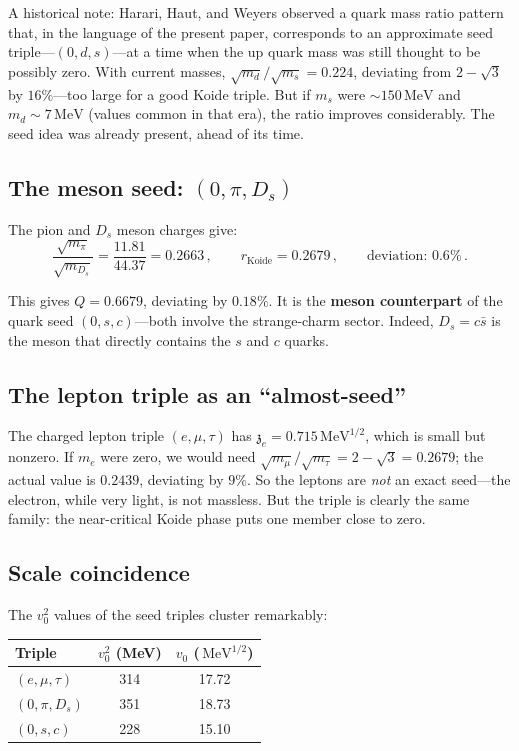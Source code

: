 \documentclass[12pt,a4paper]{article}
\newcommand{\MeV}{\,\text{MeV}}
\newcommand{\zch}{\mathfrak{z}}
\begin{document}
A historical note: Harari, Haut, and Weyers \cite{Harari} observed 
a quark mass ratio pattern that, in the language of the present paper, 
corresponds to an approximate seed triple---$(0, d, s)$---at a time 
when the up quark mass was 
still thought to be possibly zero. With current masses, 
$\sqrt{m_d}/\sqrt{m_s} = 0.224$, deviating from $2 - \sqrt{3}$ by 
$16\%$---too large for a good Koide triple. But if $m_s$ were 
$\sim 150\MeV$ and $m_d \sim 7\MeV$ (values common in that era), the 
ratio improves considerably. The seed idea was already present, ahead 
of its time.

\subsection{The meson seed: $(0, \pi, D_s)$}

The pion and $D_s$ meson charges give:
\begin{equation}
\frac{\sqrt{m_\pi}}{\sqrt{m_{D_s}}} = \frac{11.81}{44.37} = 0.2663\,, 
\qquad r_{\text{Koide}} = 0.2679\,, \qquad \text{deviation: } 0.6\%\,.
\end{equation}

This gives $Q = 0.6679$, deviating by $0.18\%$. It is the 
\textbf{meson counterpart} of the quark seed $(0, s, c)$---both 
involve the strange-charm sector. Indeed, $D_s = c\bar{s}$ is the 
meson that directly contains the $s$ and $c$ quarks.

\subsection{The lepton triple as an ``almost-seed''}

The charged lepton triple $(e, \mu, \tau)$ has $\zch_e = 0.715\MeV^{1/2}$, 
which is small but nonzero. If $m_e$ were zero, we would need 
$\sqrt{m_\mu}/\sqrt{m_\tau} = 2 - \sqrt{3} = 0.2679$; the actual value 
is $0.2439$, deviating by $9\%$. So the leptons are \emph{not} an 
exact seed---the electron, while very light, is not massless. But the 
triple is clearly the same family: the near-critical Koide phase puts 
one member close to zero.

\subsection{Scale coincidence}

The $v_0^2$ values of the seed triples cluster remarkably:

\begin{center}
\begin{tabular}{lcc}
\toprule
Triple & $v_0^2$ (MeV) & $v_0$ ($\MeV^{1/2}$) \\
\midrule
$(e, \mu, \tau)$ & 314 & 17.72 \\
$(0, \pi, D_s)$ & 351 & 18.73 \\
$(0, s, c)$ & 228 & 15.10 \\
\bottomrule
\end{tabular}
\end{center}
\end{document}
